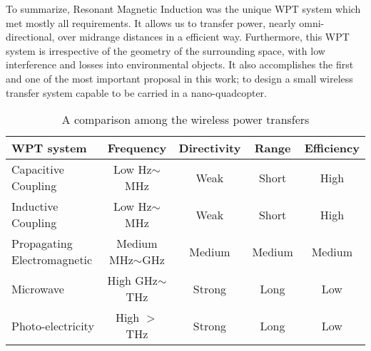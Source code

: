 To summarize, Resonant Magnetic Induction was the unique WPT system which met mostly all requirements. It allows us to transfer power, nearly omni-directional, over midrange distances in a efficient way. Furthermore, this WPT system is irrespective of the geometry of the surrounding space, with low interference and losses into environmental objects. It also accomplishes the first and one of the most important proposal in this work; to design a small wireless transfer system capable to be carried in a nano-quadcopter.


\begin{table}[ht]
\begin{center}
\begin{tabular}{|l|c|c|c|c|}
\rowcolor{black!60}
\hline
\color{white}WPT system                    & \color{white}Frequency   & \color{white}Directivity   & \color{white}Range   & \color{white}Efficiency    \\ \hline %
\rowcolor{gray!54}
Capacitive Coupling           & Low Hz$\sim$MHz     & Weak         & Short       & High             \\ \hline
\rowcolor{white}
Inductive Coupling            & Low Hz$\sim$MHz     & Weak         &  Short      & High             \\ \hline
\rowcolor{gray!40}
Propagating Electromagnetic   & Medium MHz$\sim$GHz       & Medium         &  Medium      & Medium             \\ \hline
\rowcolor{white}
Microwave   & High GHz$\sim$THz       & Strong         &  Long      & Low             \\ \hline
\rowcolor{gray!40}
Photo-electricity   & High $>$THz       & Strong         &  Long      & Low             \\ \hline %

\end{tabular}
\caption{A comparison among the wireless power transfers}
\label{T:types}
\end{center}
\end{table}
